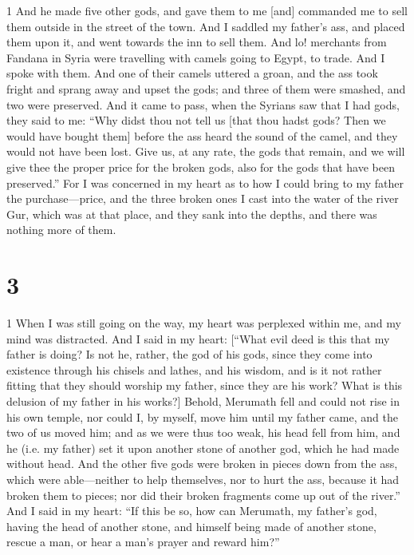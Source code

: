 \par 1 And he made five other gods, and gave them to me [and] commanded me to sell them outside in the street of the town. And I saddled my father's ass, and placed them upon it, and went towards the inn to sell them. And lo! merchants from Fandana in Syria were travelling with camels going to Egypt, to trade. And I spoke with them. And one of their camels uttered a groan, and the ass took fright and sprang away and upset the gods; and three of them were smashed, and two were preserved. And it came to pass, when the Syrians saw that I had gods, they said to me: “Why didst thou not tell us [that thou hadst gods? Then we would have bought them] before the ass heard the sound of the camel, and they would not have been lost. Give us, at any rate, the gods that remain, and we will give thee the proper price for the broken gods, also for the gods that have been preserved.” For I was concerned in my heart as to how I could bring to my father the purchase—price, and the three broken ones I cast into the water of the river Gur, which was at that place, and they sank into the depths, and there was nothing more of them.

\chapter{3}

\par 1 When I was still going on the way, my heart was perplexed within me, and my mind was distracted. And I said in my heart: [“What evil deed is this that my father is doing? Is not he, rather, the god of his gods, since they come into existence through his chisels and lathes, and his wisdom, and is it not rather fitting that they should worship my father, since they are his work? What is this delusion of my father in his works?] Behold, Merumath fell and could not rise in his own temple, nor could I, by myself, move him until my father came, and the two of us moved him; and as we were thus too weak, his head fell from him, and he (i.e. my father) set it upon another stone of another god, which he had made without head. And the other five gods were broken in pieces down from the ass, which were able—neither to help themselves, nor to hurt the ass, because it had broken them to pieces; nor did their broken fragments come up out of the river.” And I said in my heart: “If this be so, how can Merumath, my father's god, having the head of another stone, and himself being made of another stone, rescue a man, or hear a man's prayer and reward him?”

